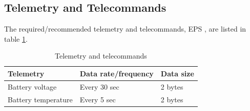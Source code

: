 \subsection{Telemetry and Telecommands}
%
The required/recommended telemetry and telecommands, \ac{EPS} , are listed in table \ref{tab:Telemetry_Telecommands}.
%
\begin{table}[H]
\centering
\caption{Telemetry and telecommands}
\label{tab:Telemetry_Telecommands}
\begin{tabular}{|l|l|l|}
\hline
\textbf{Telemetry} & \textbf{Data rate/frequency} & \textbf{Data size} \\
\hline
Battery voltage & Every 30 sec & 2 bytes\\
\hline
Battery temperature & Every 5 sec & 2 bytes\\
\hline
\end{tabular}
\end{table}